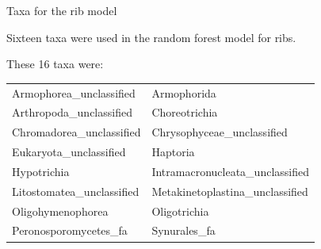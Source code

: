\documentclass{beamer}
\begin{document}
\begin{frame}{Taxa for the rib model}

  {\footnotesize
    
  \noindent  Sixteen taxa were used in the random forest model for ribs.
  
  \vspace{0.1in}

  \noindent These 16 taxa were:
  
  \vspace{0.05in}

  \begin{tabular}{ll}
    Armophorea\_unclassified & Armophorida \\
    Arthropoda\_unclassified & Choreotrichia\\
    Chromadorea\_unclassified & Chrysophyceae\_unclassified\\
    Eukaryota\_unclassified & Haptoria\\
    Hypotrichia & Intramacronucleata\_unclassified\\
    Litostomatea\_unclassified & Metakinetoplastina\_unclassified\\
    Oligohymenophorea & Oligotrichia\\
    Peronosporomycetes\_fa & Synurales\_fa
  \end{tabular}
  }

\end{frame}
\end{document}
